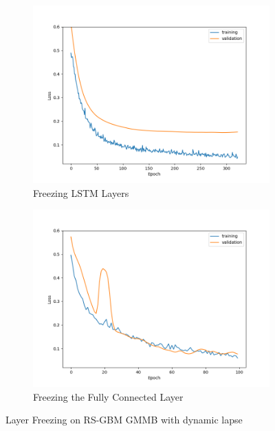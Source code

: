 \begin{figure}[ht!]
    \centering
    \begin{subfigure}{0.48\textwidth}
        \includegraphics[width=\textwidth]{./project3/figures/figure3a.png}
        \caption{Freezing LSTM Layers} 
        \label{subfig3-3:freezeLSTM}
    \end{subfigure}\hfill
    \begin{subfigure}{0.48\textwidth}
        \includegraphics[width=\textwidth]{./project3/figures/figure3b.png}
        \caption{Freezing the Fully Connected Layer}
        \label{subfig3-3:freezeFC}
    \end{subfigure}
    \caption{Layer Freezing on RS-GBM GMMB with dynamic lapse}
    \label{fig3:figure3}
\end{figure}

